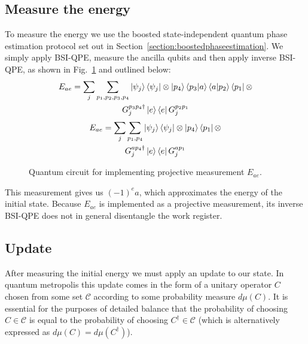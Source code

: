 \documentclass[aps,floatfix,10pt,amssymb,amsfont,amsmath,superscriptaddress,float,nofootinbib,longbibliography,nobalancelastpage,twocolumn]{revtex4-2}
\begin{document}
\subsection{Measure the energy}
\label{section:energymeasurement}
To measure the energy we use the boosted state-independent quantum phase estimation protocol set out in Section~\ref{section:boostedphaseestimation}. We simply apply BSI-QPE, measure the ancilla qubits and then apply inverse BSI-QPE, as shown in Fig.~\ref{fig:Ecircuit} and outlined below:
\begin{multline}
    E_{ae} = \sum_j\sum_{p_1,p_2,p_3,p_4} \ket{\psi_j}\bra{\psi_j} \otimes \ket{p_4}\braket{p_3|a}\braket{a|p_2}\bra{p_1} \otimes \\G_j^{p_3p_4 \dagger}\ket{e}\bra{e}G_j^{p_2p_1}
\end{multline}
\begin{multline}
        E_{ae} = \sum_j\sum_{p_1,p_4} \ket{\psi_j}\bra{\psi_j}\otimes\ket{p_4}\bra{p_1}\otimes\\
        G_j^{ap_4 \dagger}\ket{e}\bra{e}G_j^{ap_1}
\end{multline}
\begin{figure}

\caption{Quantum circuit for implementing projective measurement $E_{ae}$.}
\label{fig:Ecircuit}
\end{figure}
This measurement gives us $(-1)^ea$, which approximates the energy of the initial state. Because $E_{ae}$ is implemented as a projective measurement, its inverse BSI-QPE does not in general disentangle the work register. 
\subsection{Update}
\label{section:update}
After measuring the initial energy we must apply an update to our state. In quantum metropolis this update comes in the form of a unitary operator $C$ chosen from some set $\mathcal{C}$ according to some probability measure $d\mu(C)$. It is essential for the purposes of detailed balance that the probability of choosing $C \in \mathcal{C}$ is equal to the probability of choosing $C^{\dagger} \in \mathcal{C}$ (which is alternatively expressed as $d\mu(C) = d\mu(C^{\dagger})$).
\end{document}
